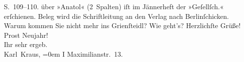 \begin{ledgroupsized}[t]{13cm}
{{{                     S. 109–110.}}}\label{K_L00150-1h} über »Anatol«
               (2 Spalten) iſt im Jännerheft der »Geſellſch.«
               erſchienen. Beleg wird die Schriftleitung an den Verlag nach Berlinſchicken. Warum kommen Sie nicht mehr ins Grienſteidl? Wie geht’s?\pend
           \pstart
           Herzlichſte Grüße!{\\[\baselineskip]}Prost Neujahr!{\\[\baselineskip]}Ihr sehr ergeb.{\\[\baselineskip]}\spacefill\mbox{Karl Kraus,}\pend
           \leftskip=0em{}\pstart
           \noindent{}I Maximilianstr. 13.\pend
           
         
         \endnumbering{}\end{ledgroupsized}  \newcommand{\dateiname}{L00150}\newcommand{\titel}{Karl Kraus an Arthur Schnitzler, 31. 12. 1892}\newcommand{\editorInnen}{Martin Anton Müller und Gerd-Hermann Susen}
      